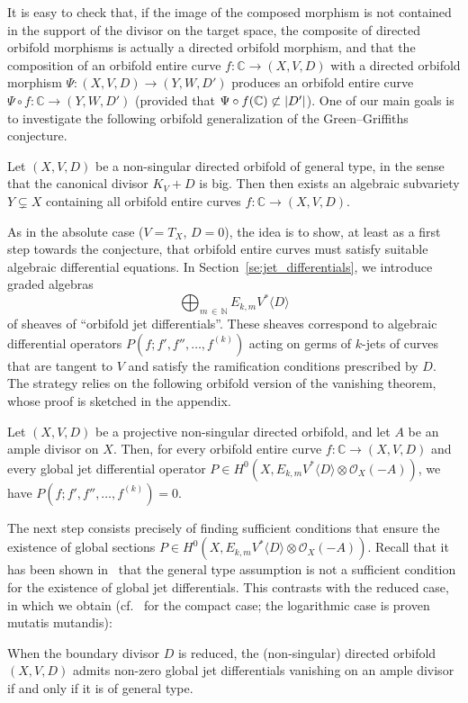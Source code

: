 \documentclass[AHL,Unicode,longabstracts,published]{cedram}
\DeclarePairedDelimiter{\abs}{\lvert}{\rvert}
\newcommand*\cO{\mathcal{O}}
\newcommand*\bC{\mathbb{C}}
\newcommand*\bN{\mathbb{N}}
\begin{document}
It is easy to check that, if the image of the composed morphism is not contained in the support of the divisor on the target space, the composite of directed orbifold morphisms is actually a directed orbifold morphism, and that the composition of an orbifold entire curve $f\colon\bC\to(X,V,D)$ with a directed orbifold morphism $\Psi\colon(X,V,D)\to(Y,W,D')$ produces an orbifold entire curve $\Psi\circ f\colon\bC\to(Y,W,D')$ (provided that $\Psi\circ f(\bC) \not \subset \abs{D'}$). One of our main goals is to investigate the following orbifold generalization of the Green--Griffiths conjecture.

\begin{conj}
Let $(X,V,D)$ be a non-singular directed orbifold of general type, in the sense that the canonical divisor $K_V+D$ is big. Then then exists an algebraic subvariety $Y\subsetneq X$ containing all orbifold entire curves
$f\colon\bC\to(X,V,D)$.
\end{conj}

As in the absolute case ($V=T_X$, $D=0$), the idea is to show, at least as a first step towards the conjecture, that orbifold entire curves must satisfy suitable algebraic differential equations. In Section~\ref{se:jet_differentials}, we introduce graded algebras
\[
\bigoplus_{m\,\in\,\bN}E_{k,m}V^*\langle D\rangle
\]
of sheaves of ``orbifold jet differentials''. These sheaves correspond to algebraic differential operators $P(f;f',f'',\dotsc,f^{(k)})$ acting on germs of $k$-jets of curves that are tangent to $V$ and satisfy the ramification conditions prescribed by $D$. The strategy relies on the following orbifold version of the vanishing theorem, whose proof is sketched in the appendix.

\begin{prop}\label{prop:vanishing}
Let $(X,V,D)$ be a projective non-singular directed orbifold, and let $A$ be an ample divisor on $X$. Then, for every orbifold entire curve $f\colon\bC\to(X,V,D)$ and every global jet differential operator $P\in H^0(X,E_{k,m}V^*\langle D\rangle \otimes\cO_X(-A))$, we have $P(f;f',f'',\dotsc,f^{(k)})=0$.
\end{prop}

The next step consists precisely of finding sufficient conditions that ensure the existence of global sections
$P\in H^0(X,E_{k,m}V^*\langle D\rangle\otimes\cO_X(-A))$. Recall that it has been shown in~\cite[Prop.~5.1]{CDR20} that the general type assumption is not a sufficient condition for the existence of global jet differentials. This contrasts with the reduced case, in which we obtain (cf.~\cite{Dem11} for the compact case; the logarithmic case is proven mutatis mutandis):
\begin{theo}
When the boundary divisor $D$ is reduced, the (non-singular) directed orbifold $(X,V,D)$ admits non-zero global jet differentials vanishing on an ample divisor if and only if it is of general type.
\end{theo}
\end{document}
